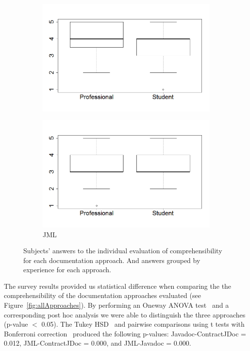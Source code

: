 \begin{figure}
\begin{subfigure}{.48\textwidth}
\includegraphics[width=1\linewidth]{figs/boxplotContractJDocXExperience.png}
\caption{\contractjdoc{}}
\label{fig:contractjdocExp}
\end{subfigure}
\begin{subfigure}{.48\textwidth}
\includegraphics[width=1\linewidth]{figs/boxplotJMLXExperience.png}
\caption{JML}
\label{fig:jmlExp}
\end{subfigure}
\caption{Subjects' answers to the individual evaluation of comprehensibility for
each documentation approach. And answers grouped by experience for each
approach.}
\label{fig:surveyResults}
\end{figure}

The survey results provided us statistical difference when comparing the the
comprehensibility of the documentation approaches evaluated (see
Figure~\ref{fig:allApproaches}). By performing an Oneway ANOVA test~\cite{statistical} and
a corresponding post hoc analysis we were able to distinguish the three
approaches (p-value $<$ 0.05).
The Tukey HSD~\cite{statistical} and pairwise comparisons using t tests
with Bonferroni correction~\cite{statistical} produced the following p-values:
Javadoc-ContractJDoc = 0.012, JML-ContractJDoc = 0.000, and JML-Javadoc = 0.000.

